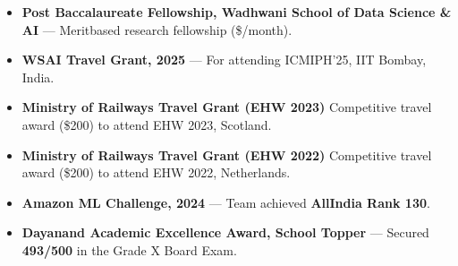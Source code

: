 

    
	
\vspace{2mm}

\begin{itemize}\setlength\itemsep{0.3em}
  \item \textbf{Post Baccalaureate Fellowship, Wadhwani School of Data Science \& AI} — Merit\textendash based research fellowship (\$/month).
  \item \textbf{WSAI Travel Grant, 2025} — For attending ICMIPH'25, IIT Bombay, India.
  \item \textbf{Ministry of Railways Travel Grant (EHW 2023)} Competitive travel award (\$200) to attend EHW 2023, Scotland.
  \item \textbf{Ministry of Railways Travel Grant (EHW 2022)} Competitive travel award (\$200) to attend EHW 2022, Netherlands.
  \item \textbf{Amazon ML Challenge, 2024} — Team achieved \textbf{All\textendash India Rank 130}.
  \item \textbf{Dayanand Academic Excellence Award, School Topper} — Secured \textbf{493/500} in the Grade X Board Exam.
\end{itemize}
 \vspace{1mm}